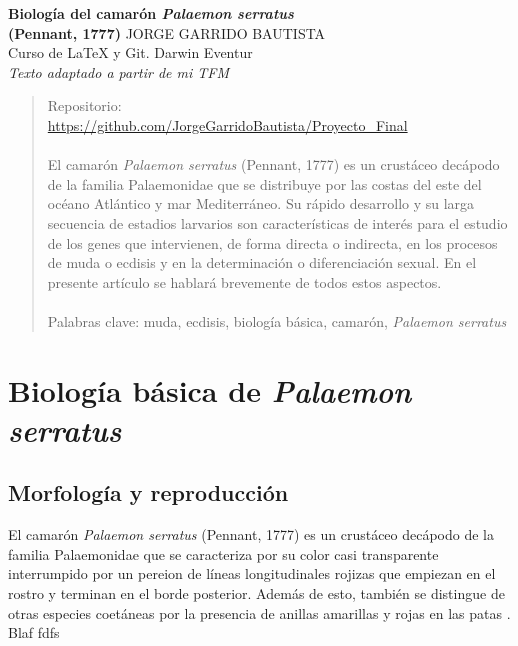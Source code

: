 \documentclass[a4paper]{article}
\begin{document}
\begin{titlepage}
\begin{center}
\vspace*{5\baselineskip} %
{\LARGE \textbf{Biología del camarón \textit{Palaemon serratus}\\(Pennant, 1777)}}
\vspace*{5\baselineskip}
\vfill %
{\large JORGE GARRIDO BAUTISTA}\\
\vspace*{4\baselineskip}
Curso de LaTeX y Git. Darwin Eventur\\
\textit{Texto adaptado a partir de mi TFM}
\end{center}
\end{titlepage}

\begin{titlepage}
\begin{abstract}
Repositorio:\\
\url{https://github.com/JorgeGarridoBautista/Proyecto_Final}\\
\\El camarón \textit{Palaemon serratus} (Pennant, 1777) es un crustáceo decápodo de la familia Palaemonidae que se distribuye por las costas del este del océano Atlántico y mar Mediterráneo. Su rápido desarrollo y su larga secuencia de estadios larvarios son características de interés para el estudio de los genes que intervienen, de forma directa o indirecta, en los procesos de muda o ecdisis y en la determinación o diferenciación sexual. En el presente artículo se hablará brevemente de todos estos aspectos.\\
\\Palabras clave: muda, ecdisis, biología básica, camarón, \textit{Palaemon serratus}
\end{abstract}
\end{titlepage}

\begin{titlepage}
\tableofcontents
\end{titlepage}

\section{Biología básica de \textit{Palaemon serratus}}
\subsection{Morfología y reproducción}
El camarón \textit{Palaemon serratus} (Pennant, 1777) es un crustáceo decápodo de la familia Palaemonidae que se caracteriza por su color casi transparente interrumpido por un pereion de líneas longitudinales rojizas que empiezan en el rostro y terminan en el borde posterior. Además de esto, también se distingue de otras especies coetáneas por la presencia de anillas amarillas y rojas en las patas \citep{Zariquiey1968}.\\
Blaf fdfs
 
\end{document}
